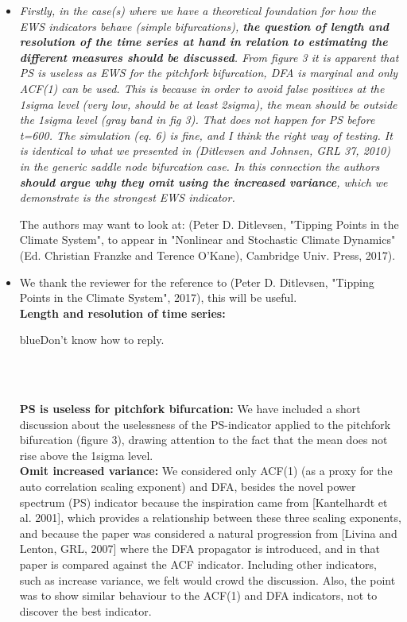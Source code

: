 \documentclass[12pt]{article}
\def\bb{\begin{color}{blue}}
\def\eb{\end{color}\ }
\begin{document}
\begin{itemize}
\item[\bf Comment 2.]
{\sl 
Firstly, in the case(s) where we have a theoretical foundation for how the EWS indicators behave (simple bifurcations), {\bf the question of length and resolution of the time series at hand in relation to estimating the different measures should be discussed}. From figure 3 it is apparent that PS is useless as EWS for the pitchfork bifurcation, DFA is marginal and only ACF(1) can be used. This is because in order to avoid false positives at the 1sigma level (very low, should be at least 2sigma), the mean should be outside the 1sigma level (gray band in fig 3). That does not happen for PS before t=600.  The simulation (eq. 6) is fine, and I think the right way of testing. It is identical to what we presented in (Ditlevsen and Johnsen, GRL 37, 2010) in the generic saddle node bifurcation case. In this connection the authors {\bf should argue why they omit using the increased variance}, which we demonstrate is the strongest EWS indicator.

The authors may want to look at: (Peter D. Ditlevsen, "Tipping Points in the Climate System", to appear in "Nonlinear and Stochastic Climate Dynamics" (Ed. Christian Franzke and Terence O'Kane), Cambridge Univ. Press, 2017).
}

\item[\bf Response 2.] 
We thank the reviewer for the reference to (Peter D. Ditlevsen, "Tipping Points in the Climate System", 2017), this will be useful.\\
{\bf Length and resolution of time series:} {\bb Don't know how to reply.\eb} \\ 
{\bf PS is useless for pitchfork bifurcation:} We have included a short discussion about the uselessness of the PS-indicator applied to the pitchfork bifurcation (figure 3), drawing attention to the fact that the mean does not rise above the 1sigma level.\\
{\bf Omit increased variance:} We considered only ACF(1) (as a proxy for the auto correlation scaling exponent) and DFA, besides the novel power spectrum (PS) indicator because the inspiration came from [Kantelhardt et al. 2001], which provides a relationship between these three scaling exponents, and because the paper was considered a natural progression from [Livina and Lenton, GRL, 2007] where the DFA propagator is introduced, and in that paper is compared against the ACF indicator. Including other indicators, such as increase variance, we felt would crowd the discussion. Also, the point was to show similar behaviour to the ACF(1) and DFA indicators, not to discover the best indicator. 


\end{itemize}
\end{document}
